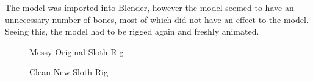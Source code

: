 \documentclass[11pt]{report}
\begin{document}
The model was imported into Blender, however the model seemed to have an unnecessary number of bones, most of which did not have an effect to the model. Seeing this, the model had to be rigged again and freshly animated. 

\begin{figure}[H]
    \begin{minipage}{.5\textwidth}
        \centering
        \caption{Messy Original Sloth Rig}
    \end{minipage}
    \begin{minipage}{.5\textwidth}
        \centering
        \caption{Clean New Sloth Rig}
    \end{minipage}
\end{figure}
\end{document}
